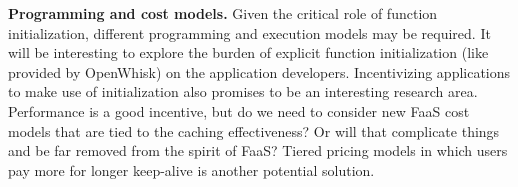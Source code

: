 \noindent \textbf{Programming and cost models.}
Given the critical role of function initialization, different programming and execution models may be required.
It will be interesting to explore the burden of explicit function initialization (like provided by OpenWhisk) on the application developers. 
Incentivizing applications to make use of initialization also promises to be an interesting research area.
Performance is a good incentive, but do we need to consider new FaaS cost models that are tied to the caching effectiveness? Or will that complicate things and be far removed from the spirit of FaaS? Tiered pricing models in which users pay more for longer keep-alive is another potential solution. 














